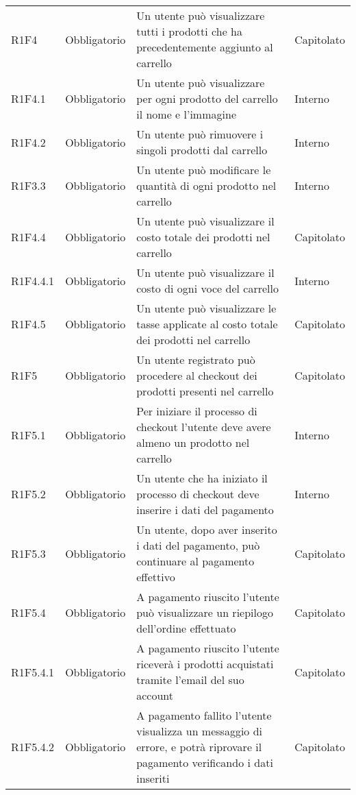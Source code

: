 {\begin{longtable}{C{2.5cm} C{2.8cm} C{6.7cm} C{2.5cm}}
R1F4 & Obbligatorio & Un utente può visualizzare tutti i prodotti che ha precedentemente aggiunto al carrello & Capitolato \\
R1F4.1 & Obbligatorio & Un utente può visualizzare per ogni prodotto del carrello il nome e l’immagine & Interno \\
R1F4.2 & Obbligatorio & Un utente può rimuovere i singoli prodotti dal carrello & Interno \\
R1F3.3 & Obbligatorio & Un utente può modificare le quantità di ogni prodotto nel carrello & Interno \\
R1F4.4 & Obbligatorio & Un utente può visualizzare il costo totale dei prodotti nel carrello & Capitolato \\
R1F4.4.1 & Obbligatorio & Un utente può visualizzare il costo di ogni voce del carrello & Interno \\
R1F4.5 & Obbligatorio & Un utente può visualizzare le tasse applicate al costo totale dei prodotti nel carrello & Capitolato \\


R1F5 & Obbligatorio & Un utente registrato può procedere al checkout dei prodotti presenti nel carrello & Capitolato \\
R1F5.1 & Obbligatorio & Per iniziare il processo di checkout l’utente deve avere almeno un prodotto nel carrello & Interno \\
R1F5.2 & Obbligatorio & Un utente che ha iniziato il processo di checkout deve inserire i dati del pagamento & Interno \\
R1F5.3 & Obbligatorio & Un utente, dopo aver inserito i dati del pagamento, può continuare al pagamento effettivo & Capitolato \\
R1F5.4 & Obbligatorio & A pagamento riuscito l’utente può visualizzare un riepilogo dell’ordine effettuato & Capitolato \\
R1F5.4.1 & Obbligatorio & A pagamento riuscito l’utente riceverà i prodotti acquistati tramite l’email del suo account & Capitolato \\
R1F5.4.2 & Obbligatorio & A pagamento fallito l’utente visualizza un messaggio di errore, e potrà riprovare il pagamento verificando i dati inseriti & Capitolato \\











\end{longtable}

}